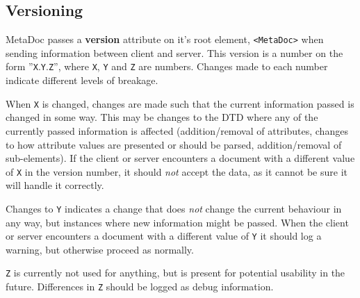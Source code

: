 \subsection{Versioning}
MetaDoc passes a \textbf{version} attribute on it's root element,
\texttt{<MetaDoc>} when sending information between client and server. This
version is a number on the form ''\texttt{X}.\texttt{Y}.\texttt{Z}'', where
\texttt{X}, \texttt{Y} and \texttt{Z} are numbers. Changes made to each number 
indicate different levels of breakage. 

When \texttt{X} is changed, changes are made such that the current information
passed is changed in some way. This may be changes to the DTD where any of the
currently passed information is affected (addition/removal of attributes,
changes to how attribute values are presented or should be parsed,
addition/removal of sub-elements). If the client or server encounters a
document with a different value of \texttt{X} in the version number, it should
\textit{not} accept the data, as it cannot be sure it will handle it correctly.

Changes to \texttt{Y} indicates a change that does \textit{not} change the
current behaviour in any way, but instances where new information might be
passed. When the client or server encounters a document with a different value
of \texttt{Y} it should log a warning, but otherwise proceed as normally.

\texttt{Z} is currently not used for anything, but is present for potential
usability in the future. Differences in \texttt{Z} should be logged as debug
information.
